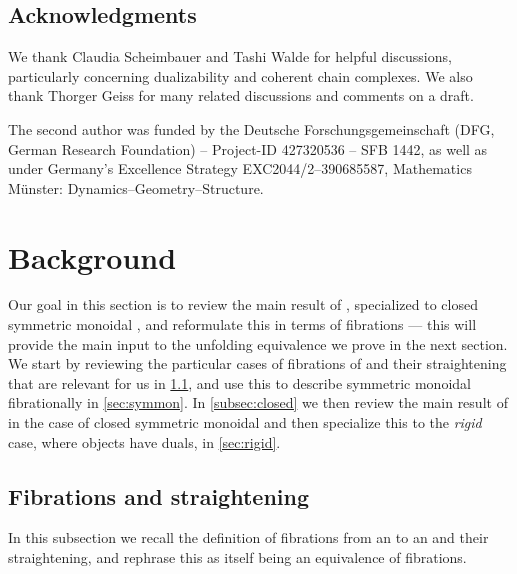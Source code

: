 \documentclass[a4paper,11pt]{article}
\begin{document}
\subsection*{Acknowledgments}
We thank Claudia Scheimbauer and Tashi Walde for helpful discussions,
particularly concerning dualizability and coherent chain complexes. We also thank Thorger Geiss for many related discussions and comments on a draft.



The second author was funded by the Deutsche Forschungsgemeinschaft (DFG, German Research
Foundation) -- Project-ID 427320536 -- SFB 1442, as well as under Germany’s Excellence Strategy
EXC2044/2–390685587, Mathematics M\"unster: Dynamics–Geometry–Structure.


\section{Background}
\label{sec:background}
Our goal in this section is to review the main result of
\cite{closed}, specialized to closed symmetric monoidal \incats{}, and
reformulate this in terms of fibrations --- this will provide the main
input to the unfolding equivalence we prove in the next section. We
start by reviewing the particular cases of fibrations of \incats{} and
their straightening that are relevant for us in \cref{sec:fib}, and
use this to describe symmetric monoidal \incats{} fibrationally in
\cref{sec:symmon}. In \cref{subsec:closed} we then review the main
result of \cite{closed} in the case of closed symmetric monoidal
\incats{} and then specialize this to the \emph{rigid} case, where objects
have duals, in \cref{sec:rigid}.

\subsection{Fibrations and straightening}
\label{sec:fib}
In this subsection we recall the definition of fibrations from an
\incat{} to an \icat{} and their straightening, and rephrase this as
itself being an equivalence of fibrations.
\end{document}
